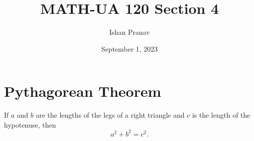 \documentclass[12pt]{article}
\title{MATH-UA 120 Section 4}
\author{Ishan Pranav}
\date{September 1, 2023}
\begin{document}
\maketitle
\section*{Pythagorean Theorem}
If $a$ and $b$ are the lengths of the legs of a right triangle and $c$ is the length of the hypotenuse, then
\[a^2+b^2=c^2.\]
\end{document}
